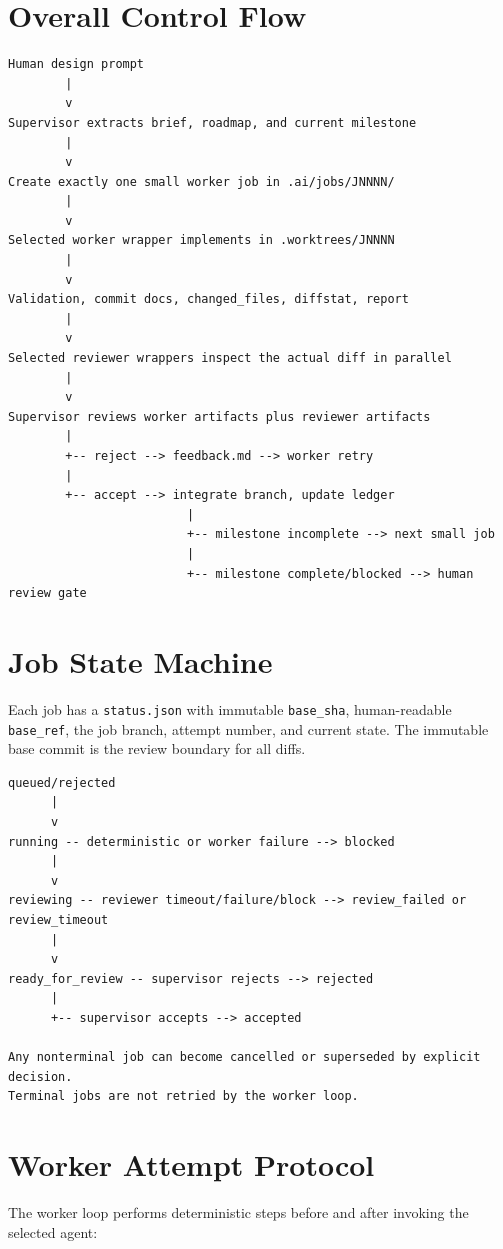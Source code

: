 \documentclass[11pt]{article}
\renewcommand{\path}[1]{\texttt{#1}}
\begin{document}
\section{Overall Control Flow}

\begin{verbatim}
Human design prompt
        |
        v
Supervisor extracts brief, roadmap, and current milestone
        |
        v
Create exactly one small worker job in .ai/jobs/JNNNN/
        |
        v
Selected worker wrapper implements in .worktrees/JNNNN
        |
        v
Validation, commit docs, changed_files, diffstat, report
        |
        v
Selected reviewer wrappers inspect the actual diff in parallel
        |
        v
Supervisor reviews worker artifacts plus reviewer artifacts
        |
        +-- reject --> feedback.md --> worker retry
        |
        +-- accept --> integrate branch, update ledger
                         |
                         +-- milestone incomplete --> next small job
                         |
                         +-- milestone complete/blocked --> human review gate
\end{verbatim}

\section{Job State Machine}

Each job has a \path{status.json} with immutable \path{base\_sha},
human-readable \path{base\_ref}, the job branch, attempt number, and current
state.  The immutable base commit is the review boundary for all diffs.

\begin{verbatim}
queued/rejected
      |
      v
running -- deterministic or worker failure --> blocked
      |
      v
reviewing -- reviewer timeout/failure/block --> review_failed or review_timeout
      |
      v
ready_for_review -- supervisor rejects --> rejected
      |
      +-- supervisor accepts --> accepted

Any nonterminal job can become cancelled or superseded by explicit decision.
Terminal jobs are not retried by the worker loop.
\end{verbatim}

\section{Worker Attempt Protocol}

The worker loop performs deterministic steps before and after invoking the selected agent:
\end{document}
